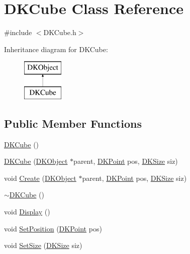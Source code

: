 \hypertarget{class_d_k_cube}{\section{D\-K\-Cube Class Reference}
\label{class_d_k_cube}
}


{\ttfamily \#include $<$D\-K\-Cube.\-h$>$}

Inheritance diagram for D\-K\-Cube\-:\begin{figure}[H]
\begin{center}
\leavevmode
\includegraphics[height=2.000000cm]{class_d_k_cube}
\end{center}
\end{figure}
\subsection*{Public Member Functions}
\begin{DoxyCompactItemize}
\item 
\hyperlink{class_d_k_cube_ae730400c3ef6ffb8f20809d9da76b608}{D\-K\-Cube} ()
\item 
\hyperlink{class_d_k_cube_ad1c8bfe16259006fe7e377d70be2cbed}{D\-K\-Cube} (\hyperlink{class_d_k_object}{D\-K\-Object} $\ast$parent, \hyperlink{_d_k_axis_8h_a0ca1f005fbb936f8e7a7f2433591f418}{D\-K\-Point} pos, \hyperlink{_d_k_axis_8h_aaa25a8c7cbf504fffdb8a4208ff7a731}{D\-K\-Size} siz)
\item 
void \hyperlink{class_d_k_cube_a1a159f9f6751802c828272acb6ca176a}{Create} (\hyperlink{class_d_k_object}{D\-K\-Object} $\ast$parent, \hyperlink{_d_k_axis_8h_a0ca1f005fbb936f8e7a7f2433591f418}{D\-K\-Point} pos, \hyperlink{_d_k_axis_8h_aaa25a8c7cbf504fffdb8a4208ff7a731}{D\-K\-Size} siz)
\item 
\hyperlink{class_d_k_cube_a9446816d3f386e7d5ef19b73bb82a7c1}{$\sim$\-D\-K\-Cube} ()
\item 
void \hyperlink{class_d_k_cube_a2d86544adc0b81d545df904ab4ef800e}{Display} ()
\item 
void \hyperlink{class_d_k_cube_aa22327478c206be39cd68d847283f6bc}{Set\-Position} (\hyperlink{_d_k_axis_8h_a0ca1f005fbb936f8e7a7f2433591f418}{D\-K\-Point} pos)
\item 
void \hyperlink{class_d_k_cube_a9a2ec210470c0aa0ed314c02725405bd}{Set\-Size} (\hyperlink{_d_k_axis_8h_aaa25a8c7cbf504fffdb8a4208ff7a731}{D\-K\-Size} siz)
\end{DoxyCompactItemize}
